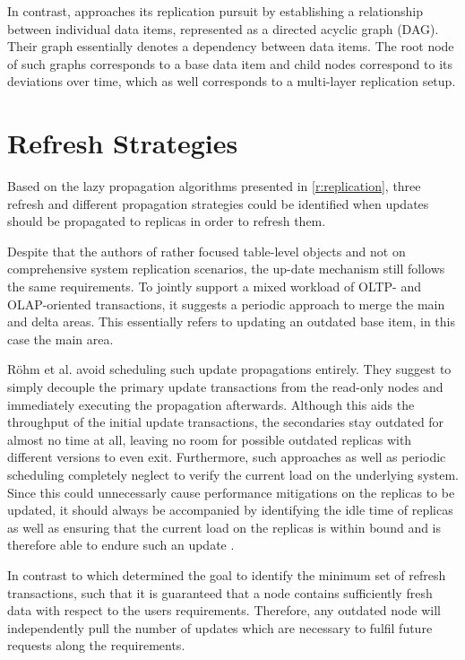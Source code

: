 In contrast, \cite{xiang:2008} approaches its replication pursuit by establishing a relationship between individual data items, represented as a directed acyclic graph (DAG).
Their graph essentially denotes a dependency between data items. The root node of such graphs corresponds to a base data item and child nodes correspond 
to its deviations over time, which as well corresponds to a multi-layer replication setup.





\section{Refresh Strategies}
\label{r:strategies}
Based on the lazy propagation algorithms presented in \ref{r:replication}, three refresh and different propagation strategies could be identified when updates should be propagated 
to replicas in order to refresh them.

Despite that the authors of \cite{psaroudakis:2015} rather focused table-level objects and not on comprehensive system replication scenarios, the up-date mechanism 
still follows the same requirements. To jointly support a mixed workload of OLTP- and OLAP-oriented transactions,
it suggests a periodic approach to merge the main and delta areas. This essentially refers to updating an outdated base item, in this case the main area.

Röhm et al. \cite{rohm:2002} avoid scheduling such update propagations entirely. They suggest to simply decouple the primary update transactions from the read-only nodes
and immediately executing the propagation afterwards. Although this aids the throughput of the initial update transactions, the secondaries 
stay outdated for almost no time at all, leaving no room for possible outdated replicas with different versions to even exit. 
Furthermore, such approaches as well as periodic scheduling completely neglect to verify the current load on the underlying system.
Since this could unnecessarly cause performance mitigations on the replicas to be updated, it should always be accompanied by identifying the idle time of replicas as well 
as ensuring that the current load on the replicas is within bound and is therefore able to endure such an update \cite{voicu:2010}.

In contrast to \cite{peralta:2006} which determined the goal to identify the minimum set of refresh transactions, such that it is guaranteed that a node contains 
sufficiently fresh data with respect to the users requirements. Therefore, any outdated node will independently pull the number of updates which are necessary to 
fulfil future requests along the requirements.

